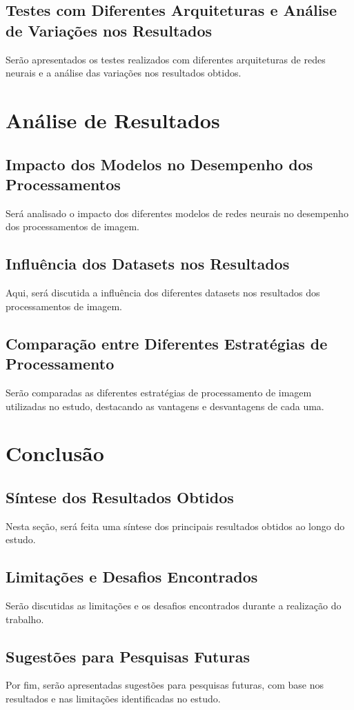 \section{Testes com Diferentes Arquiteturas e Análise de Variações nos Resultados}
Serão apresentados os testes realizados com diferentes arquiteturas de redes neurais e a análise das variações nos resultados obtidos.

\chapter{Análise de Resultados}
\section{Impacto dos Modelos no Desempenho dos Processamentos}
Será analisado o impacto dos diferentes modelos de redes neurais no desempenho dos processamentos de imagem.

\section{Influência dos Datasets nos Resultados}
Aqui, será discutida a influência dos diferentes datasets nos resultados dos processamentos de imagem.

\section{Comparação entre Diferentes Estratégias de Processamento}
Serão comparadas as diferentes estratégias de processamento de imagem utilizadas no estudo, destacando as vantagens e desvantagens de cada uma.

\chapter{Conclusão}
\section{Síntese dos Resultados Obtidos}
Nesta seção, será feita uma síntese dos principais resultados obtidos ao longo do estudo.

\section{Limitações e Desafios Encontrados}
Serão discutidas as limitações e os desafios encontrados durante a realização do trabalho.

\section{Sugestões para Pesquisas Futuras}
Por fim, serão apresentadas sugestões para pesquisas futuras, com base nos resultados e nas limitações identificadas no estudo.
